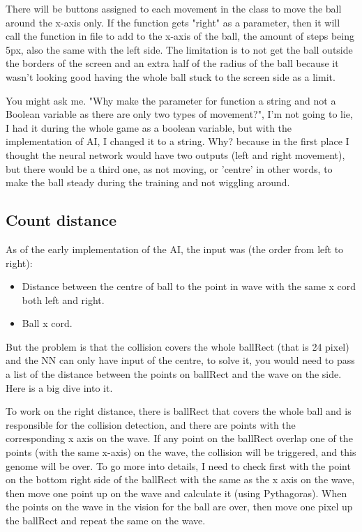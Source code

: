 There will be buttons assigned to each movement in the class to move the ball around the x-axis only. If the function gets "right" as a parameter, then it will call the  function in  file to add to the x-axis of the ball, the amount of steps being 5px, also the same with the left side. The limitation is to not get the ball outside the borders of the screen and an extra half of the radius of the ball because it wasn't looking good having the whole ball stuck to the screen side as a limit.

You might ask me. "Why make the parameter for function a string and not a Boolean variable as there are only two types of movement?", I'm not going to lie, I had it during the whole game as a boolean variable, but with the implementation of AI, I changed it to a string. Why? because in the first place I thought the neural network would have two outputs (left and right movement), but there would be a third one, as not moving, or 'centre' in other words, to make the ball steady during the training and not wiggling around.

\subsection{Count distance}\label{sec:count-distance}
As of the early implementation of the AI, the input was (the order from left to right):
\begin{itemize}
\item Distance between the centre of ball to the point in wave with the same x cord both left and right.
\item Ball x cord.
\end{itemize}

But the problem is that the collision covers the whole ballRect (that is 24 pixel) and the NN can only have input of the centre, to solve it, you would need to pass a list of the distance between the points on ballRect and the wave on the side. Here is a big dive into it.

To work on the right distance, there is ballRect that covers the whole ball and is responsible for the collision detection, and there are points with the corresponding x axis on the wave. If any point on the ballRect overlap one of the points (with the same x-axis) on the wave, the collision will be triggered, and this genome will be over. To go more into details, I need to check first with the point on the bottom right side of the ballRect with the same as the x axis on the wave, then move one point up on the wave and calculate it (using Pythagoras). When the points on the wave in the vision for the ball are over, then move one pixel up the ballRect and repeat the same on the wave.


